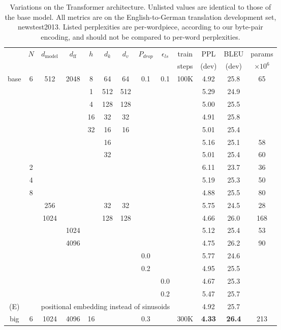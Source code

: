 \documentclass{article}
\newcommand{\dmodel}{d_{\text{model}}}
\newcommand{\dff}{d_{\text{ff}}}
\begin{document}
\begin{table}[t]
\caption{Variations on the Transformer architecture. Unlisted values are identical to those of the base model.  All metrics are on the English-to-German translation development set, newstest2013.  Listed perplexities are per-wordpiece, according to our byte-pair encoding, and should not be compared to per-word perplexities.}
\label{tab:variations}
\begin{center}
\vspace{-2mm}

\begin{tabular}{c|ccccccccc|ccc}
\hline\rule{0pt}{2.0ex}
 & \multirow{2}{*}{$N$} & \multirow{2}{*}{$\dmodel$} &
\multirow{2}{*}{$\dff$} & \multirow{2}{*}{$h$} & 
\multirow{2}{*}{$d_k$} & \multirow{2}{*}{$d_v$} & 
\multirow{2}{*}{$P_{drop}$} & \multirow{2}{*}{$\epsilon_{ls}$} &
train & PPL & BLEU & params \\
 & & & & & & & & & steps & (dev) & (dev) & $\times10^6$ \\

\hline\rule{0pt}{2.0ex}
base & 6 & 512 & 2048 & 8 & 64 & 64 & 0.1 & 0.1 & 100K & 4.92 & 25.8 & 65 \\
\hline\rule{0pt}{2.0ex}
\multirow{4}{*}{(A)}
& & & & 1 & 512 & 512 & & & & 5.29 & 24.9 &  \\
& & & & 4 & 128 & 128 & & & & 5.00 & 25.5 &  \\
& & & & 16 & 32 & 32 & & & & 4.91 & 25.8 &  \\
& & & & 32 & 16 & 16 & & & & 5.01 & 25.4 &  \\
\hline\rule{0pt}{2.0ex}
\multirow{2}{*}{(B)}
& & & & & 16 & & & & & 5.16 & 25.1 & 58 \\
& & & & & 32 & & & & & 5.01 & 25.4 & 60 \\
\hline\rule{0pt}{2.0ex}
\multirow{7}{*}{(C)}
& 2 & & & & & & & &            & 6.11 & 23.7 & 36 \\
& 4 & & & & & & & &            & 5.19 & 25.3 & 50 \\
& 8 & & & & & & & &            & 4.88 & 25.5 & 80 \\
& & 256 & & & 32 & 32 & & &    & 5.75 & 24.5 & 28 \\
& & 1024 & & & 128 & 128 & & & & 4.66 & 26.0 & 168 \\
& & & 1024 & & & & & &         & 5.12 & 25.4 & 53 \\
& & & 4096 & & & & & &         & 4.75 & 26.2 & 90 \\
\hline\rule{0pt}{2.0ex}
\multirow{4}{*}{(D)}
& & & & & & & 0.0 & & & 5.77 & 24.6 &  \\
& & & & & & & 0.2 & & & 4.95 & 25.5 &  \\
& & & & & & & & 0.0 & & 4.67 & 25.3 &  \\
& & & & & & & & 0.2 & & 5.47 & 25.7 &  \\
\hline\rule{0pt}{2.0ex}
(E) & & \multicolumn{7}{c}{positional embedding instead of sinusoids} & & 4.92 & 25.7 & \\
\hline\rule{0pt}{2.0ex}
big & 6 & 1024 & 4096 & 16 & & & 0.3 & & 300K & \textbf{4.33} & \textbf{26.4} & 213 \\
\hline
\end{tabular}


\end{center}
\end{table}
\end{document}

